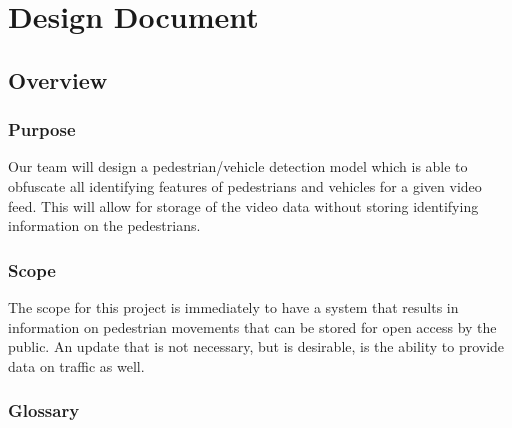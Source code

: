 \chapter{Design Document}

\section{Overview}

\subsection{Purpose}

Our team will design a pedestrian/vehicle detection model which is able to obfuscate all identifying features of pedestrians and vehicles for a given video feed. This will allow for storage of the video data without storing identifying information on the pedestrians.

\subsection{Scope}

The scope for this project is immediately to have a system that results in information on pedestrian movements that can be stored for open access by the public. An update that is not necessary, but is desirable, is the ability to provide data on traffic as well.

\subsection{Glossary}

